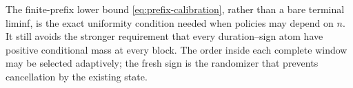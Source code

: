 \begin{remark}
The finite-prefix lower bound \eqref{eq:prefix-calibration}, rather than a
bare terminal liminf, is the exact uniformity condition needed when policies
may depend on \(n\).  It still avoids the stronger requirement that every
duration--sign atom have positive conditional mass at every block.  The order
inside each complete window may be selected adaptively; the fresh sign is the
randomizer that prevents cancellation by the existing state.
\end{remark}
